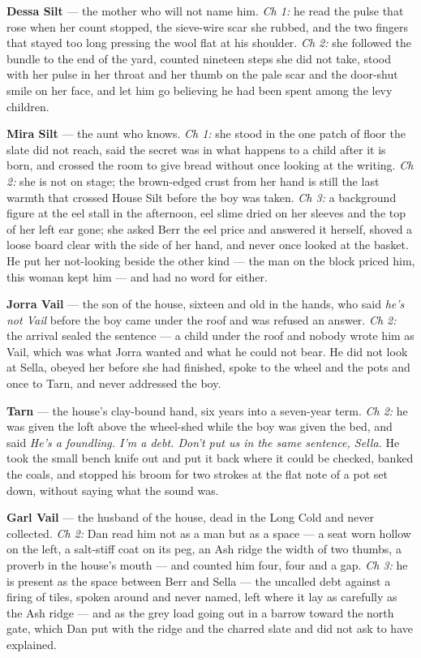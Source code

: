 \documentclass{design/chronicle}
\begin{document}
{\textbf{Dessa Silt} — the mother who will not name him. \emph{Ch 1:} he read the pulse that rose when her count stopped, the sieve-wire scar she rubbed, and the two fingers that stayed too long pressing the wool flat at his shoulder. \emph{Ch 2:} she followed the bundle to the end of the yard, counted nineteen steps she did not take, stood with her pulse in her throat and her thumb on the pale scar and the door-shut smile on her face, and let him go believing he had been spent among the levy children.

\textbf{Mira Silt} — the aunt who knows. \emph{Ch 1:} she stood in the one patch of floor the slate did not reach, said the secret was in what happens to a child after it is born, and crossed the room to give bread without once looking at the writing. \emph{Ch 2:} she is not on stage; the brown-edged crust from her hand is still the last warmth that crossed House Silt before the boy was taken. \emph{Ch 3:} a background figure at the eel stall in the afternoon, eel slime dried on her sleeves and the top of her left ear gone; she asked Berr the eel price and answered it herself, shoved a loose board clear with the side of her hand, and never once looked at the basket. He put her not-looking beside the other kind --- the man on the block priced him, this woman kept him --- and had no word for either.

\textbf{Jorra Vail} — the son of the house, sixteen and old in the hands, who said \emph{he’s not Vail} before the boy came under the roof and was refused an answer. \emph{Ch 2:} the arrival sealed the sentence --- a child under the roof and nobody wrote him as Vail, which was what Jorra wanted and what he could not bear. He did not look at Sella, obeyed her before she had finished, spoke to the wheel and the pots and once to Tarn, and never addressed the boy.

\textbf{Tarn} — the house’s clay-bound hand, six years into a seven-year term. \emph{Ch 2:} he was given the loft above the wheel-shed while the boy was given the bed, and said \emph{He’s a foundling. I’m a debt. Don’t put us in the same sentence, Sella.} He took the small bench knife out and put it back where it could be checked, banked the coals, and stopped his broom for two strokes at the flat note of a pot set down, without saying what the sound was.

\textbf{Garl Vail} — the husband of the house, dead in the Long Cold and never collected. \emph{Ch 2:} Dan read him not as a man but as a space --- a seat worn hollow on the left, a salt-stiff coat on its peg, an Ash ridge the width of two thumbs, a proverb in the house’s mouth --- and counted him four, four and a gap. \emph{Ch 3:} he is present as the space between Berr and Sella --- the uncalled debt against a firing of tiles, spoken around and never named, left where it lay as carefully as the Ash ridge --- and as the grey load going out in a barrow toward the north gate, which Dan put with the ridge and the charred slate and did not ask to have explained.

}
\end{document}
